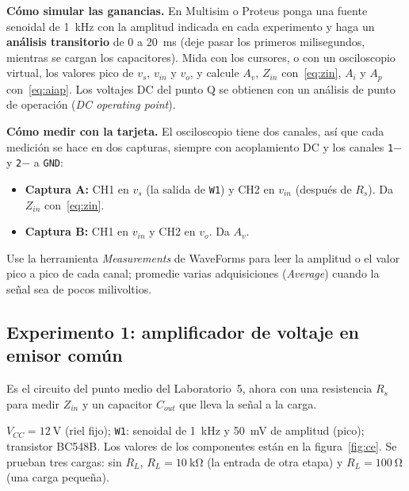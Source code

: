 \documentclass[11pt,a4paper]{article}
\begin{document}
\noindent\textbf{Cómo simular las ganancias.} En Multisim o Proteus ponga una fuente senoidal
de \qty{1}{\kilo\hertz} con la amplitud indicada en cada experimento y haga un
\textbf{análisis transitorio} de \qty{0}{} a \qty{20}{\milli\second} (deje pasar los primeros
milisegundos, mientras se cargan los capacitores). Mida con los cursores, o con un
osciloscopio virtual, los valores pico de $v_s$, $v_{in}$ y $v_o$, y calcule $A_v$, $Z_{in}$
con~\eqref{eq:zin}, $A_i$ y $A_p$ con~\eqref{eq:aiap}. Los voltajes DC del punto Q se obtienen
con un análisis de punto de operación (\emph{DC operating point}).

\noindent\textbf{Cómo medir con la tarjeta.} El osciloscopio tiene dos canales, así que cada
medición se hace en dos capturas, siempre con acoplamiento DC y los canales \texttt{1$-$} y
\texttt{2$-$} a \texttt{GND}:
\begin{itemize}
  \item \textbf{Captura A:} CH1 en $v_s$ (la salida de \texttt{W1}) y CH2 en $v_{in}$ (después de
        $R_s$). Da $Z_{in}$ con~\eqref{eq:zin}.
  \item \textbf{Captura B:} CH1 en $v_{in}$ y CH2 en $v_o$. Da $A_v$.
\end{itemize}
Use la herramienta \emph{Measurements} de WaveForms para leer la amplitud o el valor pico a
pico de cada canal; promedie varias adquisiciones (\emph{Average}) cuando la señal sea de pocos
milivoltios.

\subsection{Experimento 1: amplificador de voltaje en emisor común}
Es el circuito del punto medio del Laboratorio~5, ahora con una resistencia $R_s$ para medir
$Z_{in}$ y un capacitor $C_{out}$ que lleva la señal a la carga.

$V_{CC} = \qty{12}{\volt}$ (riel fijo); \texttt{W1}: senoidal de \qty{1}{\kilo\hertz} y
\qty{50}{\milli\volt} de amplitud (pico); transistor BC548B. Los valores de los componentes
están en la figura~\ref{fig:ce}. Se prueban tres cargas: sin $R_L$,
$R_L = \qty{10}{\kilo\ohm}$ (la entrada de otra etapa) y $R_L = \qty{100}{\ohm}$ (una carga
pequeña).
\end{document}
